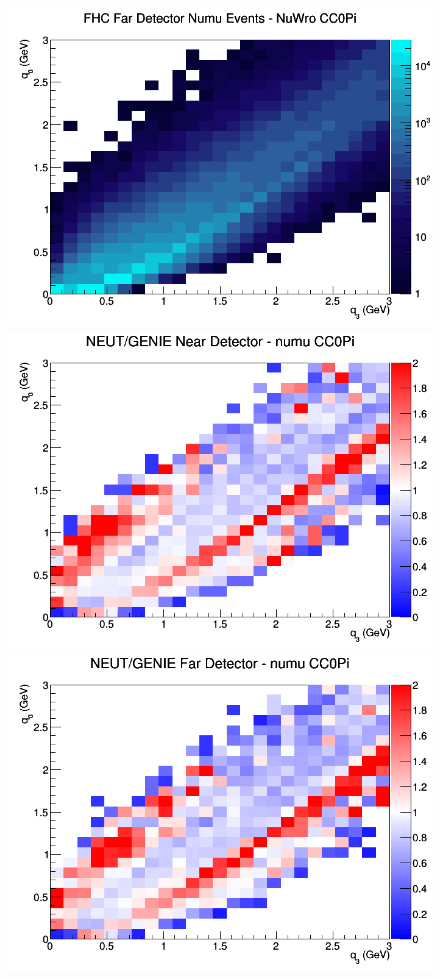 \documentclass[12pt]{article}
\begin{document}
\begin{figure}[h]
\endminipage
{}
\includegraphics[width=\linewidth]{eff_q0_q3/LAr/CC0Pi_FHC_FD_numu_q3_q0_NuWro.png}
\endminipage
\newline
{}
\includegraphics[width=\linewidth]{eff_q0_q3/LAr/ratios/CC0Pi_NEUT_GENIE_numu_near_q3_q0.png}
\endminipage
{}
\includegraphics[width=\linewidth]{eff_q0_q3/LAr/ratios/CC0Pi_NEUT_GENIE_numu_far_q3_q0.png}

\end{figure}
\end{document}
